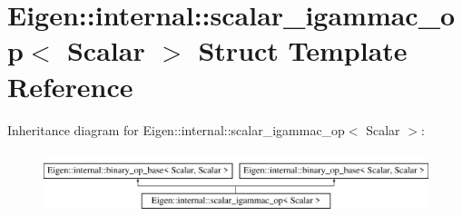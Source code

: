 \hypertarget{struct_eigen_1_1internal_1_1scalar__igammac__op}{}\section{Eigen\+:\+:internal\+:\+:scalar\+\_\+igammac\+\_\+op$<$ Scalar $>$ Struct Template Reference}
\label{struct_eigen_1_1internal_1_1scalar__igammac__op}
Inheritance diagram for Eigen\+:\+:internal\+:\+:scalar\+\_\+igammac\+\_\+op$<$ Scalar $>$\+:\begin{figure}[H]
\begin{center}
\leavevmode
\includegraphics[height=1.842105cm]{struct_eigen_1_1internal_1_1scalar__igammac__op}
\end{center}
\end{figure}
